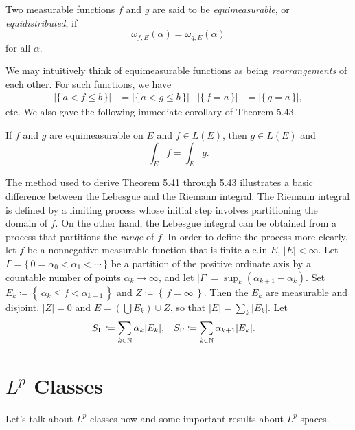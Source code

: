 Two measurable functions $f$ and $g$ are said to be
\href{https://en.wikipedia.org/wiki/Equidistributed_sequence#Sequences_equidistributed_with_respect_to_an_arbitrary_measure}{\emph{equimeasurable}},
or \emph{equidistributed}, if
\[
\omega_{f,E}(\alpha)=\omega_{g,E}(\alpha)
\]
for all $\alpha$.

We may intuitively think of equimeasurable functions as being
\emph{rearrangements} of each other. For such functions, we have
\[
\begin{aligned}
\left|\{\,a<f\leq b\,\}\right|&=
\left|\{\,a<g\leq b\,\}\right|&
\left|\{\,f=a\,\}\right|&=
\left|\{\,g=a\,\}\right|,
\end{aligned}
\]
etc. We also gave the following immediate corollary of Theorem 5.43.

\begin{corollary}[5.44]
If $f$ and $g$ are equimeasurable on $E$ and $f\in L(E)$, then $g\in
L(E)$ and
\[
\int_E f=\int_E g.
\]
\end{corollary}

The method used to derive Theorem 5.41 through 5.43 illustrates a basic
difference between the Lebesgue and the Riemann integral. The Riemann
integral is defined by a limiting process whose initial step involves
partitioning the domain of $f$. On the other hand, the Lebesgue integral
can be obtained from a process that partitions the \emph{range} of $f$. In
order to define the process more clearly, let $f$ be a nonnegative
measurable function that is finite a.e.\@ in $E$, $|E|<\infty$. Let
$\Gamma=\{\,0=\alpha_0<\alpha_1<\cdots\,\}$ be a partition of the positive
ordinate axis by a countable number of points $\alpha_k\to\infty$, and let
$|\Gamma|=\sup_k(\alpha_{k+1}-\alpha_k)$. Set
$E_k\coloneqq\left\{\,\alpha_k\leq f<\alpha_{k+1}\,\right\}$ and
$Z\coloneqq\left\{\,f=\infty\,\right\}$. Then the $E_k$ are measurable and
disjoint, $|Z|=0$ and $E=\left(\bigcup E_k\right)\cup Z$, so that
$|E|=\sum_k|E_k|$. Let
\[
  \begin{aligned}
    S_\Gamma&\coloneqq\sum_{k\in\mathbb{N}}\alpha_k|E_k|,&
    S_\Gamma&\coloneqq\sum_{k\in\mathbb{N}}\alpha_{k+1}|E_k|.
  \end{aligned}
\]

\section{$L^p$ Classes}
Let's talk about $L^p$ classes now and some important results about
$L^p$ spaces.
